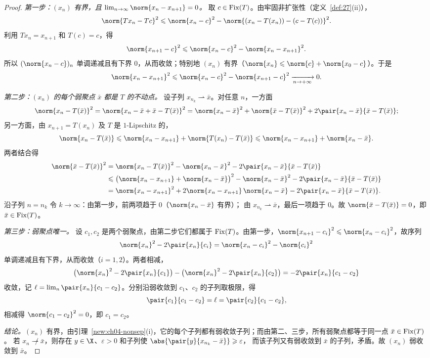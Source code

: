 \begin{proof}
\emph{第一步：$(x_n)$ 有界，且 $\lim_{n\to\infty}\norm{x_n-x_{n+1}}=0$。}
取 $c\in\operatorname{Fix}(T)$。由牢固非扩张性（定义~\ref{def:27}(ii)），
\[
  \norm{Tx_n-Tc}^2\leqslant\norm{x_n-c}^2-\norm{(x_n-T(x_n))-(c-T(c))}^2 .
\]
利用 $Tx_n=x_{n+1}$ 和 $T(c)=c$，得
\begin{equation*}
  \norm{x_{n+1}-c}^2\leqslant\norm{x_n-c}^2-\norm{x_n-x_{n+1}}^2 .
\end{equation*}
所以 $(\norm{x_n-c})_{n}$ 单调递减且有下界 $0$，从而收敛；特别地 $(x_n)$ 有界（$\norm{x_n}\leqslant\norm{c}+\norm{x_0-c}$）。于是
\[
  \norm{x_n-x_{n+1}}^2\leqslant\norm{x_n-c}^2-\norm{x_{n+1}-c}^2\xrightarrow[n\to+\infty]{}0 .
\]

\emph{第二步：$(x_n)$ 的每个弱聚点 $\bar x$ 都是 $T$ 的不动点。}
设子列 $x_{n_k}\rightharpoonup\bar x$。对任意 $n$，一方面
\[
  \norm{x_n-T(\bar x)}^2=\norm{x_n-\bar x+\bar x-T(\bar x)}^2
  =\norm{x_n-\bar x}^2+\norm{\bar x-T(\bar x)}^2+2\pair{x_n-\bar x}{\bar x-T(\bar x)} ;
\]
另一方面，由 $x_{n+1}=T(x_n)$ 及 $T$ 是 $1$-Lipschitz 的，
\[
  \norm{x_n-T(\bar x)}\leqslant\norm{x_n-x_{n+1}}+\norm{T(x_n)-T(\bar x)}\leqslant\norm{x_n-x_{n+1}}+\norm{x_n-\bar x}.
\]
两者结合得
\[
  \begin{aligned}
  \norm{\bar x-T(\bar x)}^2
  &=\norm{x_n-T(\bar x)}^2-\norm{x_n-\bar x}^2-2\pair{x_n-\bar x}{\bar x-T(\bar x)}\\
  &\leqslant\bigl(\norm{x_n-x_{n+1}}+\norm{x_n-\bar x}\bigr)^2-\norm{x_n-\bar x}^2-2\pair{x_n-\bar x}{\bar x-T(\bar x)}\\
  &=\norm{x_n-x_{n+1}}^2+2\norm{x_n-x_{n+1}}\,\norm{x_n-\bar x}-2\pair{x_n-\bar x}{\bar x-T(\bar x)} .
  \end{aligned}
\]
沿子列 $n=n_k$ 令 $k\to\infty$：由第一步，前两项趋于 $0$（$\norm{x_n-\bar x}$ 有界）；
由 $x_{n_k}\rightharpoonup\bar x$，最后一项趋于 $0$。故 $\norm{\bar x-T(\bar x)}=0$，即 $\bar x\in\operatorname{Fix}(T)$。

\emph{第三步：弱聚点唯一。}
设 $c_1,c_2$ 是两个弱聚点，由第二步它们都属于 $\operatorname{Fix}(T)$。由第一步，$\norm{x_{n+1}-c_i}^2\leqslant\norm{x_n-c_i}^2$，故序列
\[
  \norm{x_n}^2-2\pair{x_n}{c_i}=\norm{x_n-c_i}^2-\norm{c_i}^2
\]
单调递减且有下界，从而收敛（$i=1,2$）。两者相减，
\[
  \bigl(\norm{x_n}^2-2\pair{x_n}{c_1}\bigr)-\bigl(\norm{x_n}^2-2\pair{x_n}{c_2}\bigr)=-2\pair{x_n}{c_1-c_2}
\]
收敛，记 $\ell=\lim_n\pair{x_n}{c_1-c_2}$。分别沿弱收敛到 $c_1$、$c_2$ 的子列取极限，得
\[
  \pair{c_1}{c_1-c_2}=\ell=\pair{c_2}{c_1-c_2},
\]
相减得 $\norm{c_1-c_2}^2=0$，即 $c_1=c_2$。

\emph{结论。}$(x_n)$ 有界，由引理~\ref{new:ch04-nonsep}(i)，它的每个子列都有弱收敛子列；而由第二、三步，所有弱聚点都等于同一点 $\bar x\in\operatorname{Fix}(T)$。
若 $x_n\not\rightharpoonup\bar x$，则存在 $y\in\X$、$\varepsilon>0$ 和子列使 $\abs{\pair{y}{x_{n_k}-\bar x}}\geqslant\varepsilon$，
而该子列又有弱收敛到 $\bar x$ 的子列，矛盾。故 $(x_n)$ 弱收敛到 $\bar x$。
\end{proof}

